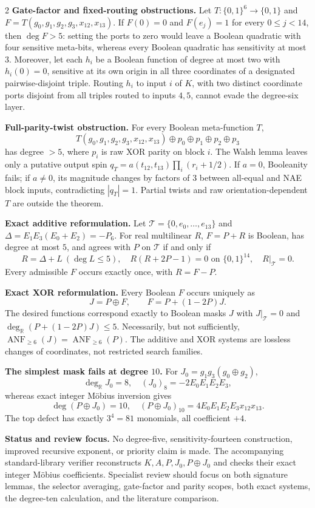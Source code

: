 \documentclass[10pt]{article}
\newcommand{\cube}[1]{\{0,1\}^{#1}}
\newcommand{\ANF}{\operatorname{ANF}}
\begin{document}
\begin{multicols}{2}
\textbf{Gate-factor and fixed-routing obstructions.}
Let $T:\cube6\to\{0,1\}$ and
$F=T(g_0,g_1,g_2,g_3,x_{12},x_{13})$.  If $F(0)=0$ and
$F(e_j)=1$ for every $0\le j<14$, then $\deg F>5$: setting the ports to zero
would leave a Boolean quadratic with four sensitive meta-bits, whereas every
Boolean quadratic has sensitivity at most $3$.  Moreover, let each $h_i$ be a
Boolean function of degree at most two with $h_i(0)=0$, sensitive at its own
origin in all three coordinates of a designated pairwise-disjoint triple.
Routing $h_i$ to input $i$ of $K$, with two distinct coordinate ports disjoint
from all triples routed to inputs $4,5$, cannot evade the degree-six layer.

\textbf{Full-parity-twist obstruction.}
For every Boolean meta-function $T$,
\[
 T(g_0,g_1,g_2,g_3,x_{12},x_{13})
 \oplus p_0\oplus p_1\oplus p_2\oplus p_3
\]
has degree $>5$, where $p_i$ is raw XOR parity on block $i$.  The Walsh lemma
leaves only a putative output spin
$q_T=a(t_{12},t_{13})\prod_i(r_i+1/2)$.  If $a=0$, Booleanity fails; if
$a\ne0$, its magnitude changes by factors of $3$ between all-equal and NAE
block inputs, contradicting $|q_T|=1$.  Partial twists and raw
orientation-dependent $T$ are outside the theorem.

\textbf{Exact additive reformulation.}
Let $\mathcal T=\{0,e_0,\ldots,e_{13}\}$ and
$\Delta=E_1E_3(E_0+E_2)=-P_6$.  For real multilinear $R$, $F=P+R$ is
Boolean, has degree at most $5$, and agrees with $P$ on $\mathcal T$ if and
only if
\[
 R=\Delta+L\ (\deg L\le5),\quad
 R(R+2P-1)=0\text{ on }\cube{14},\quad R|_{\mathcal T}=0.
\]
Every admissible $F$ occurs exactly once, with $R=F-P$.

\textbf{Exact XOR reformulation.}
Every Boolean $F$ occurs uniquely as
\[
 J=P\oplus F,\qquad F=P+(1-2P)J.
\]
The desired functions correspond exactly to Boolean masks $J$ with
$J|_{\mathcal T}=0$ and $\deg_{\mathbb R}(P+(1-2P)J)\le5$.  Necessarily, but
not sufficiently,
$\ANF_{\ge6}(J)=\ANF_{\ge6}(P)$.  The additive and XOR systems are lossless
changes of coordinates, not restricted search families.

\textbf{The simplest mask fails at degree \(10\).}
For $J_0=g_1g_3(g_0\oplus g_2)$,
\[
 \deg_{\mathbb R}J_0=8,\quad (J_0)_8=-2E_0E_1E_2E_3,
\]
whereas exact integer M\"obius inversion gives
\[
 \deg(P\oplus J_0)=10,\quad
 (P\oplus J_0)_{10}=4E_0E_1E_2E_3x_{12}x_{13}.
\]
The top defect has exactly $3^4=81$ monomials, all coefficient $+4$.

\textbf{Status and review focus.}
No degree-five, sensitivity-fourteen construction, improved recursive
exponent, or priority claim is made.  The accompanying standard-library
verifier reconstructs $K,A,P,J_0,P\oplus J_0$ and checks their exact integer
M\"obius coefficients.  Specialist review should focus on both signature
lemmas, the selector averaging, gate-factor and parity scopes, both exact
systems, the degree-ten calculation, and the literature comparison.

\end{multicols}
\end{document}
